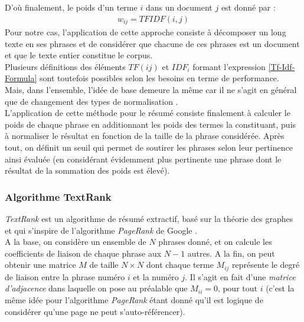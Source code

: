 D'où finalement, le poids d'un terme $ i $ dans un document $ j $ est donné par :
\begin{eqnarray}
w_{ij} = TFIDF(i,j)
\end{eqnarray}
Pour notre cas, l'application de cette approche consiste à décomposer un long texte en ses phrases et de considérer que chacune de ces phrases est un document et que le texte entier constitue le corpus.\\

Plusieurs définitions des éléments $ TF(ij) $ et $ IDF_{i} $ formant l'expression \ref{Tf-Idf-Formula} sont toutefois possibles selon les besoins en terme  de performance.\\
Mais, dans l'ensemble, l'idée de base demeure la même car il ne s'agit en général que de changement des types de normalisation \cite{vzivzka2019text}.\\

L'application de cette méthode pour le résumé consiste fi\-na\-le\-ment à calculer le poids de chaque phrase en additionnant les poids des termes la constituant, puis à normaliser le résultat en fonction de la taille de la phrase considérée. Après tout, on définit un seuil qui permet de soutirer les phrases selon leur pertinence ainsi évaluée (en considérant évidemment plus pertinente une phrase dont le résultat de la sommation des poids est élevé).
\subsubsection{Algorithme TextRank}
\textit{TextRank} est un algorithme de résumé extractif, basé sur la théorie des graphes et qui s'inspire de l'algorithme \textit{PageRank} de Google \cite{brin1998anatomy,benincasa2006page}.\\
A la base, on considère un ensemble de $ N $ phrases donné, et on calcule les coefficients de liaison de chaque phrase aux $ N-1 $ autres. A la fin, on peut obtenir une matrice $ M $ de taille $ N\times N $ dont chaque terme $ M_{ij} $ représente le degré de liaison entre la phrase numéro $ i $ et la numéro $ j $. Il s'agit en fait d'une \textit{matrice d'adjacence} dans laquelle on pose au préalable que $ M_{ii} = 0 \mbox{, pour tout } i $ (c'est la même idée pour l'algorithme \textit{PageRank} étant donné qu'il est logique de considérer qu'une page ne peut s'auto-référencer).\\

